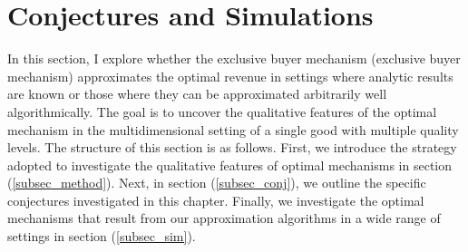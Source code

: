 



\section{Conjectures and Simulations}\label{sec_sim}


In this section, I explore whether the exclusive buyer mechanism (exclusive buyer mechanism) approximates the optimal revenue in settings where analytic results are known or those where they can be approximated arbitrarily well algorithmically. The goal is to uncover the qualitative features of the optimal mechanism in the multidimensional setting of a single good with multiple quality levels. The structure of this section is as follows. First, we introduce the strategy adopted to investigate the qualitative features of optimal mechanisms in section (\ref{subsec_method}). Next, in section (\ref{subsec_conj}), we outline the specific conjectures investigated in this chapter. Finally, we investigate the optimal mechanisms that result from our approximation algorithms in a wide range of settings in section (\ref{subsec_sim}).





